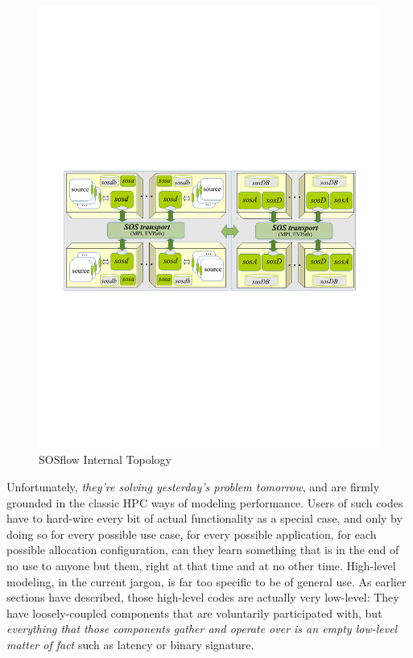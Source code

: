 \begin{figure}[!t]
  \centering
  \includegraphics[width=5in]{images/sos.pdf}
  \caption{SOSflow Internal Topology}
  \label{fig_sim}
\end{figure}





%
Unfortunately, \textit{they're solving yesterday's problem tomorrow},
and are firmly grounded in the classic HPC ways of modeling
performance.
%
Users of such codes have to hard-wire every bit of actual
functionality as a special case, and only by doing so for every
possible use case, for every possible application, for each possible
allocation configuration, can they learn something that is in the end
of no use to anyone but them, right at that time and at no other
time.
%
High-level modeling, in the current jargon, is far too specific
to be of general use.
%
As earlier sections have described, those high-level codes are
actually very low-level: They have loosely-coupled components that are
voluntarily participated with, but \textit{everything that those
  components gather and operate over is an empty low-level matter of
  fact} such as latency or binary signature.

